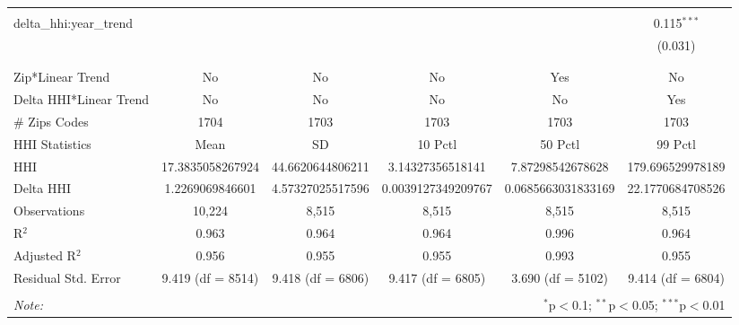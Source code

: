 \begin{table}[H]
{\begin{tabular}{@{\extracolsep{5pt}}lccccc}
   & & & & & \\  

  delta\_hhi:year\_trend &  &  &  &  & 0.115$^{***}$ \\  

   &  &  &  &  & (0.031) \\  

   & & & & & \\  

 \hline \\[-1.8ex]  

 Zip*Linear Trend & No & No & No & Yes & No \\  

 Delta HHI*Linear Trend & No & No & No & No & Yes \\  

 # Zips Codes & 1704 & 1703 & 1703 & 1703 & 1703 \\  

 HHI Statistics & Mean & SD & 10 Pctl & 50 Pctl & 99 Pctl \\  

 HHI & 17.3835058267924 & 44.6620644806211 & 3.14327356518141 & 7.87298542678628 & 179.696529978189 \\  

 Delta HHI & 1.2269069846601 & 4.57327025517596 & 0.0039127349209767 & 0.0685663031833169 & 22.1770684708526 \\  

 Observations & 10,224 & 8,515 & 8,515 & 8,515 & 8,515 \\  

 R$^{2}$ & 0.963 & 0.964 & 0.964 & 0.996 & 0.964 \\  

 Adjusted R$^{2}$ & 0.956 & 0.955 & 0.955 & 0.993 & 0.955 \\  

 Residual Std. Error & 9.419 (df = 8514) & 9.418 (df = 6806) & 9.417 (df = 6805) & 3.690 (df = 5102) & 9.414 (df = 6804) \\  

 \hline  

 \hline \\[-1.8ex]  

 \textit{Note:}  & \multicolumn{5}{r}{$^{*}$p$<$0.1; $^{**}$p$<$0.05; $^{***}$p$<$0.01} \\  

 \end{tabular}}  

 \end{table}  


